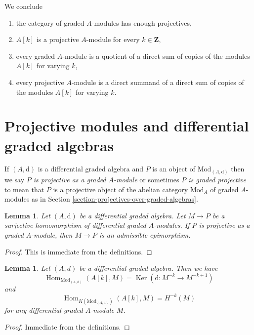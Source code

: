 \documentclass{stacks-project}
\theoremstyle{plain}
\newtheorem{lemma}[subsection]{Lemma}
\theoremstyle{definition}
\theoremstyle{remark}
\numberwithin{equation}{subsection}
\def\Hom{\mathop{\mathrm{Hom}}\nolimits}
\def\Ker{\mathop{\mathrm{Ker}}}
\begin{document}
\medskip\noindent
We conclude
\begin{enumerate}
\item the category of graded $A$-modules has enough projectives,
\item $A[k]$ is a projective $A$-module for every $k \in \mathbf{Z}$,
\item every graded $A$-module is a quotient of a direct sum of
copies of the modules $A[k]$ for varying $k$,
\item every projective $A$-module is a direct summand of a direct
sum of copies of the modules $A[k]$ for varying $k$.
\end{enumerate}




\section{Projective modules and differential graded algebras}
\label{section-projective-over-differential-graded}

\noindent
If $(A, \text{d})$ is a differential graded algebra and $P$ is
an object of $\text{Mod}_{(A, \text{d})}$ then we say
{\it $P$ is projective as a graded $A$-module} or sometimes
{\it $P$ is graded projective} to mean that $P$
is a projective object of the abelian category $\text{Mod}_A$
of graded $A$-modules as in
Section \ref{section-projectives-over-graded-algebras}.

\begin{lemma}
\label{lemma-target-graded-projective}
Let $(A, \text{d})$ be a differential graded algebra.
Let $M \to P$ be a surjective homomorphism of differential graded
$A$-modules. If $P$ is projective as a graded $A$-module, then
$M \to P$ is an admissible epimorphism.
\end{lemma}

\begin{proof}
This is immediate from the definitions.
\end{proof}

\begin{lemma}
\label{lemma-hom-from-shift-free}
Let $(A, d)$ be a differential graded algebra. Then we have
$$
\Hom_{\text{Mod}_{(A, \text{d})}}(A[k], M) =
\Ker(\text{d} : M^{-k} \to M^{-k + 1})
$$
and
$$
\Hom_{K(\text{Mod}_{(A, \text{d})})}(A[k], M) = H^{-k}(M)
$$
for any differential graded $A$-module $M$.
\end{lemma}

\begin{proof}
Immediate from the definitions.
\end{proof}
\end{document}
